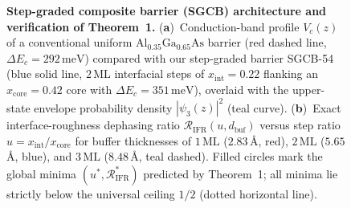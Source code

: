 \documentclass[11pt,letterpaper]{article}
\begin{document}
\begin{figure}[t!]
\centering
\resizebox{0.97\textwidth}{!}{}
\caption{\textbf{Step-graded composite barrier (SGCB) architecture and verification of Theorem~1.} (\textbf{a})~Conduction-band profile $V_c(z)$ of a conventional uniform $\mathrm{Al}_{0.35}\mathrm{Ga}_{0.65}\mathrm{As}$ barrier (red dashed line, $\Delta E_c = 292\,\mathrm{meV}$) compared with our step-graded barrier SGCB-54 (blue solid line, $2\,\mathrm{ML}$ interfacial steps of $x_{\mathrm{int}}=0.22$ flanking an $x_{\mathrm{core}}=0.42$ core with $\Delta E_c = 351\,\mathrm{meV}$), overlaid with the upper-state envelope probability density $|\psi_3(z)|^2$ (teal curve). (\textbf{b})~Exact interface-roughness dephasing ratio $\mathcal{R}_{\mathrm{IFR}}(u, d_{\mathrm{buf}})$ versus step ratio $u = x_{\mathrm{int}}/x_{\mathrm{core}}$ for buffer thicknesses of $1\,\mathrm{ML}$ ($2.83$\,\AA, red), $2\,\mathrm{ML}$ ($5.65$\,\AA, blue), and $3\,\mathrm{ML}$ ($8.48$\,\AA, teal dashed). Filled circles mark the global minima $(u^*, \mathcal{R}_{\mathrm{IFR}}^*)$ predicted by Theorem~1; all minima lie strictly below the universal ceiling $1/2$ (dotted horizontal line).}
\label{fig:ifr_bound}
\end{figure}
\end{document}

